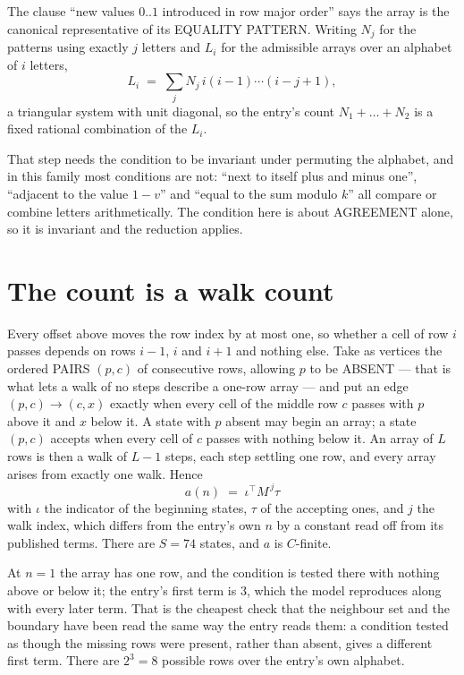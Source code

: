 \documentclass[11pt,a4paper]{article}
\theoremstyle{plain}
\theoremstyle{definition}
\begin{document}
The clause ``new values $0..1$ introduced in row major order'' says the array is the
canonical representative of its EQUALITY PATTERN. Writing $N_j$ for the patterns using exactly
$j$ letters and $L_i$ for the admissible arrays over an alphabet of $i$ letters,
\[
L_i\;=\;\sum_j N_j\,i(i-1)\cdots(i-j+1),
\]
a triangular system with unit diagonal, so the entry's count $N_1+\dots+N_{2}$ is a
fixed rational combination of the $L_i$.

That step needs the condition to be invariant under permuting the alphabet, and in this family
most conditions are not: ``next to itself plus and minus one'', ``adjacent to the value
$1-v$'' and ``equal to the sum modulo $k$'' all compare or combine letters arithmetically.
The condition here is about AGREEMENT alone, so it is invariant and the reduction applies.

\section{The count is a walk count}

Every offset above moves the row index by at most one, so whether a cell of row $i$ passes
depends on rows $i-1$, $i$ and $i+1$ and nothing else. Take as vertices the ordered PAIRS
$(p,c)$ of consecutive rows, allowing $p$ to be ABSENT --- that is what lets a walk of no steps
describe a one-row array --- and put an edge $(p,c)\to(c,x)$ exactly when every cell of the
middle row $c$ passes with $p$ above it and $x$ below it. A state with $p$ absent may begin an
array; a state $(p,c)$ accepts when every cell of $c$ passes with nothing below it. An array of
$L$ rows is then a walk of $L-1$ steps, each step settling one row, and every array arises from
exactly one walk. Hence
\[
a(n)\;=\;\iota^{\!\top}M^{\,j}\tau
\]
with $\iota$ the indicator of the beginning states, $\tau$ of the accepting ones, and $j$ the
walk index, which differs from the entry's own $n$ by a constant read off from its published
terms. There are $S=74$ states, and $a$ is $C$-finite.

At $n=1$ the array has one row, and
the condition is tested there with nothing above or below it; the entry's first term is
$3$, which the model reproduces along with every later term. That is the cheapest check
that the neighbour set and the boundary have been read the same way the entry reads them: a
condition tested as though the missing rows were present, rather than absent, gives a different
first term. There are $2^{3}=8$ possible rows over the entry's own alphabet.
\end{document}
